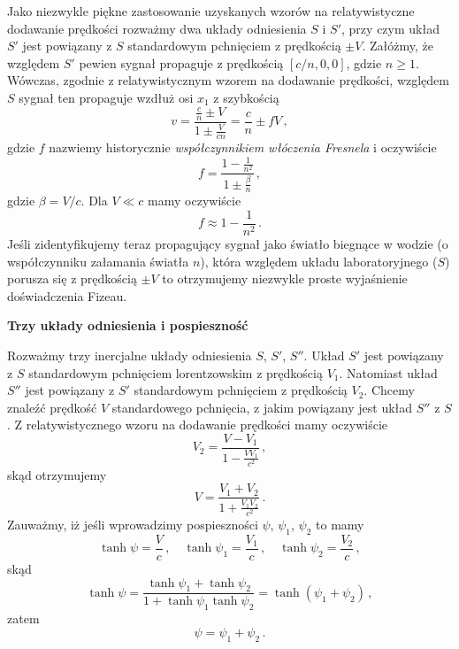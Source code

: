 \documentclass[../main.tex]{subfiles}
\begin{document}
Jako niezwykle piękne zastosowanie uzyskanych wzorów na relatywistyczne dodawanie prędkości rozważmy
dwa układy odniesienia \(S\) i \(S'\), przy czym układ \(S'\) jest powiązany z \(S\) standardowym
pchnięciem z prędkością \(\pm V\). Załóżmy, że względem \(S'\) pewien sygnał propaguje z prędkością
\([c/n,0,0]\), gdzie \(n\geq1\). Wówczas, zgodnie z relatywistycznym wzorem na dodawanie prędkości,
względem \(S\) sygnał ten propaguje wzdłuż osi \(x_1\) z szybkością
\begin{equation*}
    v=\frac{\frac{c}{n}\pm V}{1\pm\frac{V}{cn}}=\frac{c}{n}\pm fV\,,
\end{equation*}
gdzie \(f\) nazwiemy historycznie \textit{współczynnikiem włóczenia Fresnela} i oczywiście
\begin{equation*}
    f=\frac{1-\frac{1}{n^2}}{1\pm\frac{\beta}{n}}\,,
\end{equation*}
gdzie \(\beta=V/c\). Dla \(V\ll c\) mamy oczywiście
\begin{equation*}
    f\approx 1-\frac{1}{n^2}\,.
\end{equation*}
Jeśli zidentyfikujemy teraz propagujący sygnał jako światło biegnące w wodzie (o współczynniku
załamania światła \(n\)), która względem układu laboratoryjnego (\(S\)) porusza się z prędkością
\(\pm V\) to otrzymujemy niezwykle proste wyjaśnienie doświadczenia Fizeau.
\medskip

\noindent\textbf{Trzy układy odniesienia i pospieszność}
\medskip

Rozważmy trzy inercjalne układy odniesienia \(S\), \(S'\), \(S''\). Układ \(S'\) jest powiązany z
\(S\) standardowym pchnięciem lorentzowskim z prędkością \(V_1\). Natomiast układ \(S''\) jest
powiązany z \(S'\) standardowym pchnięciem z prędkością \(V_2\). Chcemy znaleźć prędkość \(V\)
standardowego pchnięcia, z jakim powiązany jest układ \(S''\) z \(S\). Z relatywistycznego wzoru na
dodawanie prędkości mamy oczywiście
\begin{equation*}
    V_2=\frac{V-V_1}{1-\frac{VV_1}{c^2}}\,,
\end{equation*}
skąd otrzymujemy
\begin{equation*}
    V=\frac{V_1+V_2}{1+\frac{V_1V_2}{c^2}}\,.
\end{equation*}
Zauważmy, iż jeśli wprowadzimy pospieszności \(\psi\), \(\psi_1\), \(\psi_2\) to mamy
\begin{equation*}
    \tanh\psi=\frac{V}{c}\,,\quad\tanh\psi_1=\frac{V_1}{c}\,,\quad\tanh\psi_2=\frac{V_2}{c}\,,
\end{equation*}
skąd
\begin{equation*}
    \tanh\psi=\frac{\tanh\psi_1+\tanh\psi_2}{1+\tanh\psi_1\tanh\psi_2}=\tanh(\psi_1+\psi_2)\,,
\end{equation*}
zatem
\begin{equation*}
    \psi=\psi_1+\psi_2\,.
\end{equation*}
\end{document}
